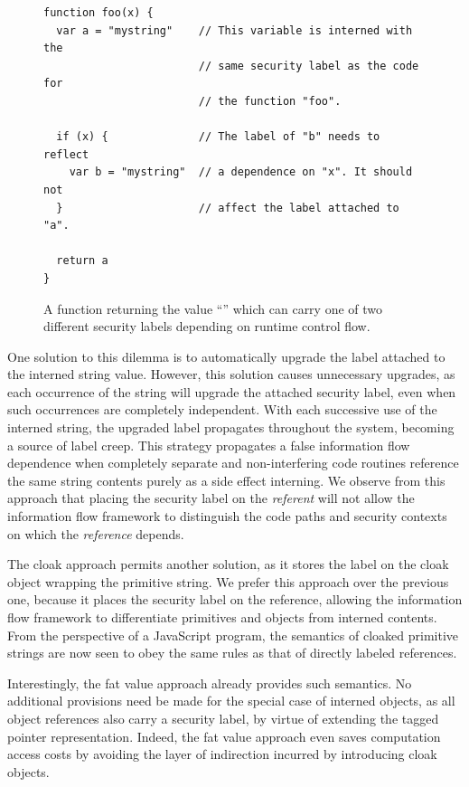 \begin{figure}[h]
\begin{lstlisting}
function foo(x) {
  var a = "mystring"    // This variable is interned with the
                        // same security label as the code for
                        // the function "foo".

  if (x) {              // The label of "b" needs to reflect
    var b = "mystring"  // a dependence on "x". It should not
  }                     // affect the label attached to "a".

  return a
}
\end{lstlisting}
  \caption{A function returning the value ``'' which can carry one of two different security labels depending on runtime control flow.}
  \label{list:interned-string}
\end{figure}

One solution to this dilemma is to automatically upgrade the label attached to the interned string value.
However, this solution causes unnecessary upgrades, as each occurrence of the string will upgrade the attached security label, even when such occurrences are completely independent.
With each successive use of the interned string, the upgraded label propagates throughout the system, becoming a source of label creep.
This strategy propagates a false information flow dependence when completely separate and non-interfering code routines reference the same string contents purely as a side effect interning.
We observe from this approach that placing the security label on the \emph{referent} will not allow the information flow framework to distinguish the code paths and security contexts on which the \emph{reference} depends.

The cloak approach permits another solution, as it stores the label on the cloak object wrapping the primitive string.
We prefer this approach over the previous one, because it places the security label on the reference, allowing the information flow framework to differentiate primitives and objects from interned contents.
From the perspective of a JavaScript program, the semantics of cloaked primitive strings are now seen to obey the same rules as that of directly labeled references.

Interestingly, the fat value approach already provides such semantics.
No additional provisions need be made for the special case of interned objects, as all object references also carry a security label, by virtue of extending the tagged pointer representation.
Indeed, the fat value approach even saves computation access costs by avoiding the layer of indirection incurred by introducing cloak objects.

